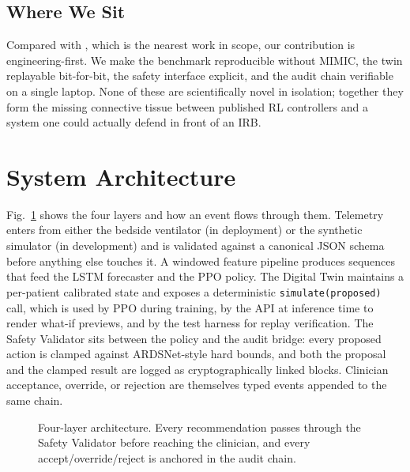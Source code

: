 \documentclass[conference]{IEEEtran}
\begin{document}
\subsection{Where We Sit}
Compared with \cite{access2025_bc_lstm_ppo}, which is the nearest work in scope, our contribution is engineering-first. We make the benchmark reproducible without MIMIC, the twin replayable bit-for-bit, the safety interface explicit, and the audit chain verifiable on a single laptop. None of these are scientifically novel in isolation; together they form the missing connective tissue between published RL controllers and a system one could actually defend in front of an IRB.

\section{System Architecture}
\label{sec:arch}

Fig.~\ref{fig:arch} shows the four layers and how an event flows through them. Telemetry enters from either the bedside ventilator (in deployment) or the synthetic simulator (in development) and is validated against a canonical JSON schema before anything else touches it. A windowed feature pipeline produces sequences that feed the LSTM forecaster and the PPO policy. The Digital Twin maintains a per-patient calibrated state and exposes a deterministic \texttt{simulate(proposed)} call, which is used by PPO during training, by the API at inference time to render what-if previews, and by the test harness for replay verification. The Safety Validator sits between the policy and the audit bridge: every proposed action is clamped against ARDSNet-style hard bounds, and both the proposal and the clamped result are logged as cryptographically linked blocks. Clinician acceptance, override, or rejection are themselves typed events appended to the same chain.

\begin{figure}[t]
  \centering
  \caption{Four-layer architecture. Every recommendation passes through the Safety Validator before reaching the clinician, and every accept/override/reject is anchored in the audit chain.}
  \label{fig:arch}
\end{figure}
\end{document}

